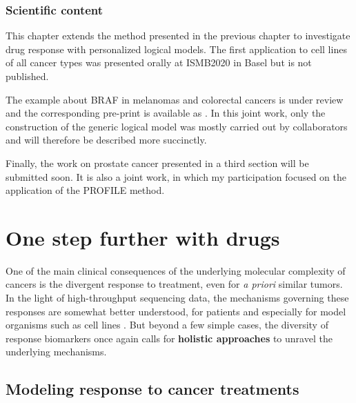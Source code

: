 \documentclass[a4paper,12pt,twoside,onecolumn,openright,final,oldfontcommands]{memoir}
\let\BeginKnitrBlock\begin \let\EndKnitrBlock\end
\begin{document}
\BeginKnitrBlock{summarybox}
\subsubsection*{Scientific content}\label{scientific-content-3}

This chapter extends the method presented in the previous chapter to
investigate drug response with personalized logical models. The first
application to cell lines of all cancer types was presented orally at
ISMB2020 in Basel but is not published.

The example about BRAF in melanomas and colorectal cancers is under
review and the corresponding pre-print is available as
\citet{beal2020personalized}. In this joint work, only the construction
of the generic logical model was mostly carried out by collaborators and
will therefore be described more succinctly.

Finally, the work on prostate cancer presented in a third section will
be submitted soon. It is also a joint work, in which my participation
focused on the application of the PROFILE method.
\EndKnitrBlock{summarybox}

\section{One step further with drugs}\label{one-step-further-with-drugs}

One of the main clinical consequences of the underlying molecular
complexity of cancers is the divergent response to treatment, even for
\emph{a priori} similar tumors. In the light of high-throughput
sequencing data, the mechanisms governing these responses are somewhat
better understood, for patients and especially for model organisms such
as cell lines \citep{heiser2012subtype, garnett2012systematic}. But
beyond a few simple cases, the diversity of response biomarkers once
again calls for \textbf{holistic approaches} to unravel the underlying
mechanisms.

\subsection{Modeling response to cancer
treatments}\label{modeling-response-to-cancer-treatments}
\end{document}
